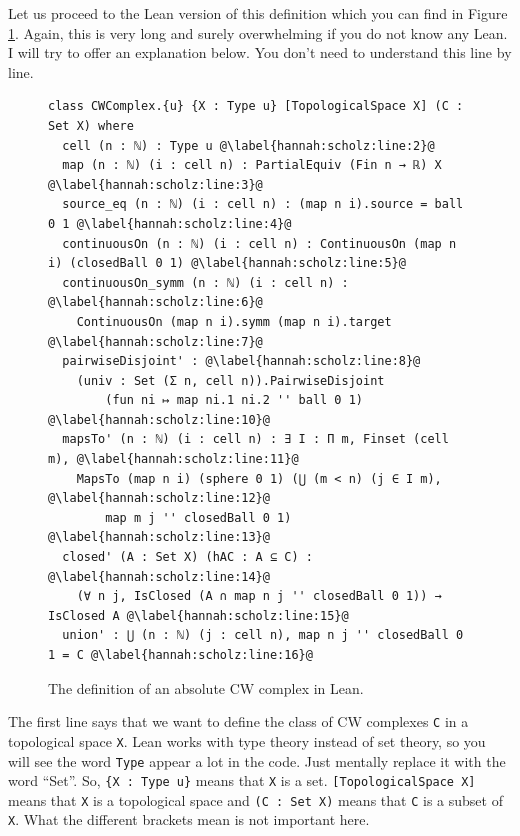 Let us proceed to the Lean version of this definition which you can find in Figure \ref{hannah:scholz:fig:3}. Again, this is very long and surely overwhelming if you do not know any Lean. I will try to offer an explanation below. You don't need to understand this line by line. 

\begin{figure}[H]
\begin{lstlisting}[language=lean, escapechar=@]
class CWComplex.{u} {X : Type u} [TopologicalSpace X] (C : Set X) where
  cell (n : ℕ) : Type u @\label{hannah:scholz:line:2}@
  map (n : ℕ) (i : cell n) : PartialEquiv (Fin n → ℝ) X @\label{hannah:scholz:line:3}@
  source_eq (n : ℕ) (i : cell n) : (map n i).source = ball 0 1 @\label{hannah:scholz:line:4}@
  continuousOn (n : ℕ) (i : cell n) : ContinuousOn (map n i) (closedBall 0 1) @\label{hannah:scholz:line:5}@
  continuousOn_symm (n : ℕ) (i : cell n) : @\label{hannah:scholz:line:6}@
    ContinuousOn (map n i).symm (map n i).target @\label{hannah:scholz:line:7}@
  pairwiseDisjoint' : @\label{hannah:scholz:line:8}@
    (univ : Set (Σ n, cell n)).PairwiseDisjoint 
        (fun ni ↦ map ni.1 ni.2 '' ball 0 1) @\label{hannah:scholz:line:10}@
  mapsTo' (n : ℕ) (i : cell n) : ∃ I : Π m, Finset (cell m), @\label{hannah:scholz:line:11}@
    MapsTo (map n i) (sphere 0 1) (⋃ (m < n) (j ∈ I m),  @\label{hannah:scholz:line:12}@
        map m j '' closedBall 0 1) @\label{hannah:scholz:line:13}@
  closed' (A : Set X) (hAC : A ⊆ C) : @\label{hannah:scholz:line:14}@
    (∀ n j, IsClosed (A ∩ map n j '' closedBall 0 1)) → IsClosed A @\label{hannah:scholz:line:15}@
  union' : ⋃ (n : ℕ) (j : cell n), map n j '' closedBall 0 1 = C @\label{hannah:scholz:line:16}@
\end{lstlisting}
\caption{The definition of an absolute CW complex in Lean.}
\label{hannah:scholz:fig:3}
\end{figure}

The first line says that we want to define the class of CW complexes \lstinline[language=lean]|C| in a topological space \lstinline[language=lean]|X|. Lean works with type theory instead of set theory, so you will see the word \lstinline[language=lean]|Type| appear a lot in the code. Just mentally replace it with the word ``Set''. So, \lstinline[language=lean]|{X : Type u}| means that \lstinline[language=lean]|X| is a set. \lstinline[language=lean]|[TopologicalSpace X]| means that \lstinline[language=lean]|X| is a topological space and \lstinline[language=lean]|(C : Set X)| means that \lstinline[language=lean]|C| is a subset of \lstinline[language=lean]|X|. What the different brackets mean is not important here. 

